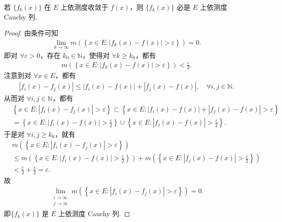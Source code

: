 \documentclass[../../main.tex]{subfiles}
\begin{document}
\begin{theorem}\label{theorem:依测度收敛必是依测度Cauchy列}
若 $\{f_k(x)\}$ 在 $E$ 上依测度收敛于 $f(x)$，则 $\{f_k(x)\}$ 必是 $E$ 上依测度 Cauchy 列.
\end{theorem}
\begin{proof}
由条件可知
\begin{align*}
\lim_{k\rightarrow\infty}m\left(\left\{x\in E:\left|f_k(x)-f(x)\right|>\varepsilon\right\}\right)=0.
\end{align*}
即对 $\forall\varepsilon > 0$，存在 $k_0\in\mathbb{N}$，使得对 $\forall k\geqslant k_0$，都有
\begin{align*}
m\left(\left\{x\in E:\left|f_k(x)-f(x)\right|>\varepsilon\right\}\right)<\frac{\varepsilon}{2}.
\end{align*}
注意到对 $\forall x\in E$，都有
\begin{align*}
\left|f_i(x)-f_j(x)\right|\leqslant\left|f_i(x)-f(x)\right|+\left|f_j(x)-f(x)\right|,\quad\forall i,j\in\mathbb{N}.
\end{align*}
从而对 $\forall i,j\in\mathbb{N}$，都有
\begin{align*}
&\left\{x\in E:\left|f_i(x)-f_j(x)\right|>\varepsilon\right\}\subset\left\{x\in E:\left|f_i(x)-f(x)\right|+\left|f_j(x)-f(x)\right|>\varepsilon\right\}\\
&=\left\{x\in E:\left|f_i(x)-f(x)\right|>\frac{\varepsilon}{2}\right\}\cup\left\{x\in E:\left|f_j(x)-f(x)\right|>\frac{\varepsilon}{2}\right\}.
\end{align*}
于是对 $\forall i,j\geqslant k_0$，就有
\begin{align*}
&m\left(\left\{x\in E:\left|f_i(x)-f_j(x)\right|>\varepsilon\right\}\right)\\
&\leqslant m\left(\left\{x\in E:\left|f_i(x)-f(x)\right|>\frac{\varepsilon}{2}\right\}\right)+m\left(\left\{x\in E:\left|f_j(x)-f(x)\right|>\frac{\varepsilon}{2}\right\}\right)\\
&<\frac{\varepsilon}{2}+\frac{\varepsilon}{2}=\varepsilon.
\end{align*}
故
\begin{align*}
\lim_{\substack{i\rightarrow\infty\\j\rightarrow\infty}}m\left(\left\{x\in E:\left|f_i(x)-f_j(x)\right|>\varepsilon\right\}\right)=0.
\end{align*}
即$\{f_k(x)\}$ 是 $E$ 上依测度 Cauchy 列.
\end{proof}
\end{document}
